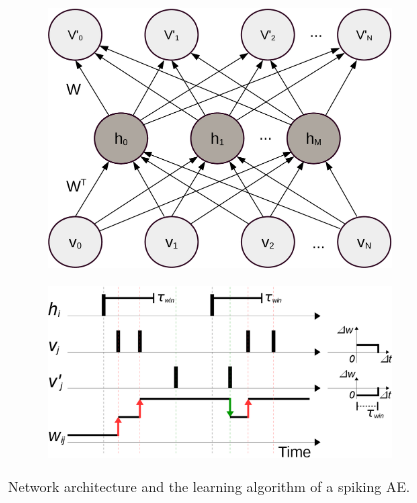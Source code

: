 \begin{figure}[th]
	\centering
	\begin{subfigure}[t]{0.35\textwidth}
		\includegraphics[width=\textwidth]{pics_sdlm/AE.png}
	\end{subfigure}
	\begin{subfigure}[t]{0.6\textwidth}
		\includegraphics[width=\textwidth]{pics_sdlm/rSTDP.png}
	\end{subfigure}
	\caption{Network architecture and the learning algorithm of a spiking AE.}
	\label{fig:rSTDP}
\end{figure}

